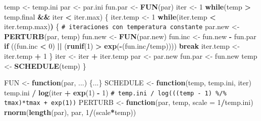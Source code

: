 \documentclass[
  spanish,
  10pt,
]{book}
\newenvironment{Shaded}{\begin{snugshade}}{\end{snugshade}}
\newcommand{\AttributeTok}[1]{\textcolor[rgb]{0.13,0.29,0.53}{#1}}
\newcommand{\CommentTok}[1]{\textcolor[rgb]{0.56,0.35,0.01}{\textit{#1}}}
\newcommand{\ControlFlowTok}[1]{\textcolor[rgb]{0.13,0.29,0.53}{\textbf{#1}}}
\newcommand{\DecValTok}[1]{\textcolor[rgb]{0.00,0.00,0.81}{#1}}
\newcommand{\ErrorTok}[1]{\textcolor[rgb]{0.64,0.00,0.00}{\textbf{#1}}}
\newcommand{\FunctionTok}[1]{\textcolor[rgb]{0.13,0.29,0.53}{\textbf{#1}}}
\newcommand{\NormalTok}[1]{#1}
\newcommand{\OtherTok}[1]{\textcolor[rgb]{0.56,0.35,0.01}{#1}}
\newcommand{\SpecialCharTok}[1]{\textcolor[rgb]{0.81,0.36,0.00}{\textbf{#1}}}
\theoremstyle{break}
\theoremstyle{nonumberplain}
\renewcommand{\CommentTok}[1]{\textcolor[rgb]{0.41,0.41,0.41}{\texttt{#1}}}
\begin{document}
\begin{Shaded}
\begin{Highlighting}[]
\NormalTok{temp }\OtherTok{\textless{}{-}}\NormalTok{ temp.ini}
\NormalTok{par }\OtherTok{\textless{}{-}}\NormalTok{ par.ini}
\NormalTok{fun.par }\OtherTok{\textless{}{-}} \FunctionTok{FUN}\NormalTok{(par)}
\NormalTok{iter }\OtherTok{\textless{}{-}} \DecValTok{1}
\ControlFlowTok{while}\NormalTok{(temp }\SpecialCharTok{\textgreater{}}\NormalTok{ temp.final }\SpecialCharTok{\&\&}\NormalTok{ iter }\SpecialCharTok{\textless{}}\NormalTok{ iter.max) \{}
\NormalTok{  iter.temp }\OtherTok{\textless{}{-}} \DecValTok{1}
  \ControlFlowTok{while}\NormalTok{(iter.temp }\SpecialCharTok{\textless{}}\NormalTok{ iter.temp.max)}\ErrorTok{)}\NormalTok{ \{ }\CommentTok{\# iteraciones con temperatura constante}
\NormalTok{    par.new }\OtherTok{\textless{}{-}} \FunctionTok{PERTURB}\NormalTok{(par, temp)}
\NormalTok{    fun.new }\OtherTok{\textless{}{-}} \FunctionTok{FUN}\NormalTok{(par.new)}
\NormalTok{    fun.inc }\OtherTok{\textless{}{-}}\NormalTok{ fun.new }\SpecialCharTok{{-}}\NormalTok{ fun.par}
    \ControlFlowTok{if}\NormalTok{ ((fun.inc }\SpecialCharTok{\textless{}} \DecValTok{0}\NormalTok{) }\SpecialCharTok{||}\NormalTok{ (}\FunctionTok{runif}\NormalTok{(}\DecValTok{1}\NormalTok{) }\SpecialCharTok{\textgreater{}} \FunctionTok{exp}\NormalTok{(}\SpecialCharTok{{-}}\NormalTok{(fun.inc}\SpecialCharTok{/}\NormalTok{temp)))) }\ControlFlowTok{break}
\NormalTok{    iter.temp }\OtherTok{\textless{}{-}}\NormalTok{ iter.temp }\SpecialCharTok{+} \DecValTok{1}
\NormalTok{  \}}
\NormalTok{  iter }\OtherTok{\textless{}{-}}\NormalTok{ iter }\SpecialCharTok{+}\NormalTok{ iter.temp}
\NormalTok{  par }\OtherTok{\textless{}{-}}\NormalTok{ par.new}
\NormalTok{  fun.par }\OtherTok{\textless{}{-}}\NormalTok{ fun.new}
\NormalTok{  temp }\OtherTok{\textless{}{-}} \FunctionTok{SCHEDULE}\NormalTok{(temp)}
\NormalTok{\}}

\NormalTok{FUN }\OtherTok{\textless{}{-}} \ControlFlowTok{function}\NormalTok{(par, ...) \{...\}}
\NormalTok{SCHEDULE }\OtherTok{\textless{}{-}} \ControlFlowTok{function}\NormalTok{(temp, temp.ini, iter) }
\NormalTok{  temp.ini }\SpecialCharTok{/} \FunctionTok{log}\NormalTok{(iter }\SpecialCharTok{+} \FunctionTok{exp}\NormalTok{(}\DecValTok{1}\NormalTok{) }\SpecialCharTok{{-}} \DecValTok{1}\NormalTok{)}
  \CommentTok{\# temp.ini / log(((temp {-} 1) \%/\% tmax)*tmax + exp(1))}
\NormalTok{PERTURB }\OtherTok{\textless{}{-}} \ControlFlowTok{function}\NormalTok{(par, temp, }\AttributeTok{scale =} \DecValTok{1}\SpecialCharTok{/}\NormalTok{temp.ini) }
  \FunctionTok{rnorm}\NormalTok{(}\FunctionTok{length}\NormalTok{(par), par, }\DecValTok{1}\SpecialCharTok{/}\NormalTok{(scale}\SpecialCharTok{*}\NormalTok{temp))}
\end{Highlighting}
\end{Shaded}
\end{document}
